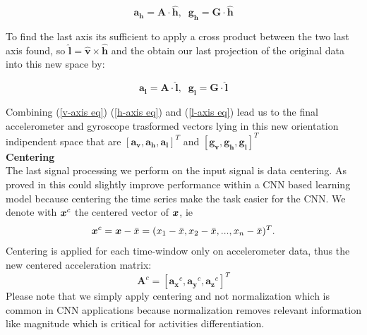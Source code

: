 \begin{equation}
	\label{h-axis eq}
	\boldsymbol{a_{h}} = \boldsymbol{A} \cdot \boldsymbol{\hat{h}} , \;\; \boldsymbol{g_{h}} = \boldsymbol{G} \cdot \boldsymbol{\hat{h}}
\end{equation}

To find the last axis its sufficient to apply a cross product between the two last axis found, so $ \boldsymbol{\hat{l}} = \boldsymbol{\hat{v}} \times \boldsymbol{\hat{h}} $ and the obtain our last projection of the original data into this new space by:

\begin{equation}
	\label{l-axis eq}
	\boldsymbol{a_{l}} = \boldsymbol{A} \cdot \boldsymbol{\hat{l}} , \;\; \boldsymbol{g_{l}} = \boldsymbol{G} \cdot \boldsymbol{\hat{l}}
\end{equation}



Combining (\ref{v-axis eq}) (\ref{h-axis eq}) and (\ref{l-axis eq}) lead us to the final accelerometer and gyroscope trasformed vectors lying in this new orientation indipendent space that are $[\boldsymbol{a_{v}}, \boldsymbol{a_{h}}, \boldsymbol{a_{l}}]^T $ and $ [\boldsymbol{g_{v}}, \boldsymbol{g_{h}}, \boldsymbol{g_{l}}]^T $ \\

\textbf{Centering}\\

The last signal processing we perform on the input signal is data
centering. As proved in \cite{ignatov2018real} this could slightly
improve performance within a CNN based learning model because
centering the time series make the task easier for the CNN. We denote with $\boldsymbol{x}^{c}$ the centered vector of $\boldsymbol{x}$, ie
\begin{equation}
  \label{eq:centering-func}
  \x^{c} = \x - \bar{x} = (x_1-\bar{x}, x_2-\bar{x},..., x_n-\bar{x})^T.
\end{equation}
Centering is applied for each time-window only on accelerometer data, thus the new centered acceleration matrix:
\begin{equation}
  \label{eq:centering-accelerometer-data}
  \boldsymbol{A}^{c} = [\boldsymbol{a_{x}}^{c}, \boldsymbol{a_{y}}^{c}, \boldsymbol{a_{z}}^{c}]^T
\end{equation}
Please note that we simply apply centering and not normalization which is common in CNN applications because normalization removes relevant information like magnitude which is critical for activities differentiation.

